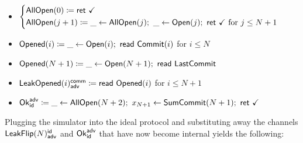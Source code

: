 \begin{itemize}
\item {\color{teal} $\begin{cases*} \AllOpen(0) \coloneqq \ret{\checkmark} \\ \AllOpen(j+1) \coloneqq \_ \leftarrow \AllOpen(j); \ \_ \leftarrow \Open(j); \ \ret{\checkmark} \text{ for $j \leq N+1$} \end{cases*}$}
\item {\color{red} $\mathsf{Opened}(i) \coloneqq \_ \leftarrow \mathsf{Open}(i); \ \mathsf{read} \ \mathsf{Commit}(i)$ for $i \leq N$}
\item {\color{red} $\mathsf{Opened}(N+1) \coloneqq \_ \leftarrow \mathsf{Open}(N+1); \ \mathsf{read} \ \mathsf{LastCommit}$}
\item {\color{red} $\mathsf{LeakOpened}(i)^{\mathsf{comm}}_{\mathsf{adv}} \coloneqq \mathsf{read} \ \mathsf{Opened}(i)$ for $i \leq N+1$}
\item $\Ok^\adv_\id \coloneqq \_ \leftarrow \AllOpen(N+2); \ x_{N+1} \leftarrow \SumCommit(N+1); \ \ret{\checkmark}$
\end{itemize}

\noindent Plugging the simulator into the ideal protocol and substituting away the channels $\mathsf{LeakFlip}(N)^{\mathsf{id}}_{\mathsf{adv}}$ and $\mathsf{Ok}^{\mathsf{adv}}_{\mathsf{id}}$ that have now become internal yields the following:

